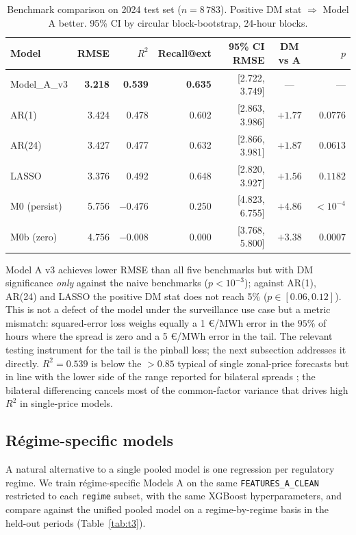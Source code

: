 \documentclass[11pt,a4paper]{article}
\begin{document}
\begin{table}[H]
\centering
\small
\caption{Benchmark comparison on 2024 test set ($n = 8\,783$).
Positive DM stat $\Rightarrow$ Model A better. 95\% CI by circular
block-bootstrap, 24-hour blocks.}
\label{tab:t2}
\begin{tabular}{lrrrrcr}
\toprule
\textbf{Model} & \textbf{RMSE} & \textbf{$R^2$} &
\textbf{Recall@ext} & \textbf{95\% CI RMSE} &
\textbf{DM vs A} & \textbf{$p$} \\
\midrule
Model\_A\_v3 & \textbf{3.218} & \textbf{0.539} & \textbf{0.635} & [2.722, 3.749] & --- & --- \\
AR(1)        & 3.424 & 0.478 & 0.602 & [2.863, 3.986] & $+1.77$ & $0.0776$ \\
AR(24)       & 3.427 & 0.477 & 0.632 & [2.866, 3.981] & $+1.87$ & $0.0613$ \\
LASSO        & 3.376 & 0.492 & 0.648 & [2.820, 3.927] & $+1.56$ & $0.1182$ \\
M0 (persist) & 5.756 & $-0.476$ & 0.250 & [4.823, 6.755] & $+4.86$ & $<10^{-4}$ \\
M0b (zero)   & 4.756 & $-0.008$ & 0.000 & [3.768, 5.800] & $+3.38$ & $0.0007$ \\
\bottomrule
\end{tabular}
\end{table}

Model A v3 achieves lower RMSE than all five benchmarks but with DM
significance \emph{only} against the naive benchmarks
($p < 10^{-3}$); against AR(1), AR(24) and LASSO the positive DM
stat does not reach 5\% ($p \in [0.06, 0.12]$). This is not a
defect of the model under the surveillance use case but a metric
mismatch: squared-error loss weighs equally a 1 €/MWh error in the
$95\%$ of hours where the spread is zero and a 5 €/MWh error in the
tail. The relevant testing instrument for the tail is the pinball
loss; the next subsection addresses it directly. $R^2 = 0.539$ is
below the $> 0.85$ typical of single zonal-price forecasts
\citep{Weron2014} but in line with the lower side of the range
reported for bilateral spreads \citep{Bunn2016}; the bilateral
differencing cancels most of the common-factor variance that drives
high $R^2$ in single-price models.

\subsection{Régime-specific models}\label{sec:regime-specific}

A natural alternative to a single pooled model is one regression per
regulatory regime. We train régime-specific Models A on the same
\texttt{FEATURES\_A\_CLEAN} restricted to each
\texttt{regime} subset, with the same XGBoost hyperparameters, and
compare against the unified pooled model on a regime-by-regime basis
in the held-out periods (Table~\ref{tab:t3}).
\end{document}
